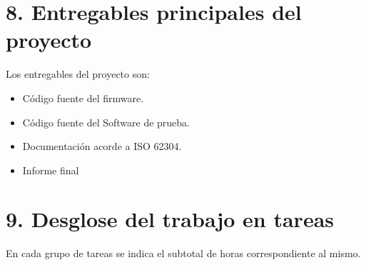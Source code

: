 \documentclass[
11pt, %
codirector, %
]{charter}
\begin{document}
%
%

\section{8. Entregables principales del proyecto}
\label{sec:entregables}

Los entregables del proyecto son:

\begin{itemize}
	\item Código fuente del firmware.
	\item Código fuente del Software de prueba.
	\item Documentación acorde a ISO 62304.
	\item Informe final
\end{itemize}

%
%
%
%

\section{9. Desglose del trabajo en tareas}
\label{sec:wbs}

En cada grupo de tareas se indica el subtotal de horas correspondiente al mismo.
\end{document}

